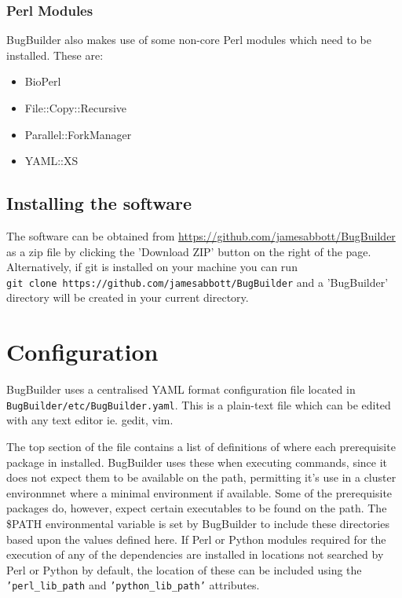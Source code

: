 \documentclass[a4paper,10pt]{article}
\begin{document}
\subsubsection{Perl Modules}

BugBuilder also makes use of some non-core Perl modules which need to be installed. These are:

\begin{itemize}
\item BioPerl 
\item File::Copy::Recursive
\item Parallel::ForkManager
\item YAML::XS
\end{itemize}

\subsection{Installing the software}

The software can be obtained from \url{https://github.com/jamesabbott/BugBuilder} as a zip file by
clicking the 'Download ZIP' button on the right of the page. Alternatively, if git is installed on
your machine you can run \\ {\tt git clone https://github.com/jamesabbott/BugBuilder} and a
'BugBuilder' directory will be created in your current directory.

\section{Configuration}

BugBuilder uses a centralised YAML format configuration file located in 
\\ {\tt BugBuilder/etc/BugBuilder.yaml}. This is a plain-text file which can be edited with any text editor
ie. gedit, vim. 

The top section of the file contains a list of definitions of where each prerequisite package in
installed. BugBuilder uses these when executing commands, since it does not expect them to be
available on the path, permitting it's use in a cluster environmnet where a minimal environment if
available. Some of the prerequisite packages do, however, expect certain executables to be found on
the path. The \$PATH environmental variable is set by BugBuilder to include these directories based
upon the values defined here. If Perl or Python modules required for the execution of any of the
dependencies are installed in locations not searched by Perl or Python by default, the location of
these can be included using the {\tt 'perl\_lib\_path} and {\tt 'python\_lib\_path'} attributes.
\end{document}
